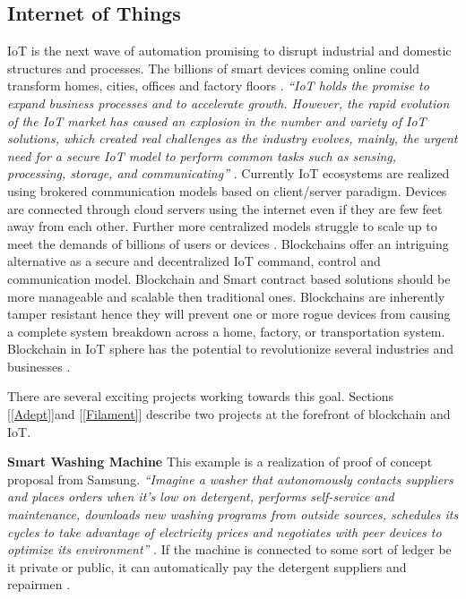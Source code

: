\subsection{Internet of Things}
IoT is the next wave of automation promising to disrupt industrial and domestic structures and processes. The billions of smart devices coming online could transform homes, cities, offices and factory floors \cite{misc:008}. \textit{“IoT holds the promise to expand business processes and to accelerate growth. However, the rapid evolution of the IoT market has caused an explosion in the number and variety of IoT solutions, which created real challenges as the industry evolves, mainly, the urgent need for a secure IoT model to perform common tasks such as sensing, processing, storage, and communicating”} \cite{misc:002}. Currently IoT ecosystems are realized using brokered communication models based on client/server paradigm. Devices are connected through cloud servers using the internet even if they are few feet away from each other. Further more centralized models struggle to scale up to meet the demands of billions of users or devices \cite{misc:004}. Blockchains offer an intriguing alternative as a secure and decentralized IoT command, control and communication model. Blockchain and Smart contract based solutions should be more manageable and scalable then traditional ones. Blockchains are inherently tamper resistant hence they will prevent one or more rogue devices from causing a complete system breakdown across a home, factory, or transportation system. Blockchain in IoT sphere has the potential to revolutionize several industries and businesses \cite{misc:008} \cite{misc:004} \cite{misc:002}.
 
There are several exciting projects working towards this goal. Sections [\ref{Adept}]and [\ref{Filament}] describe two projects at the forefront of blockchain and IoT.


\textbf{Smart Washing Machine}
This example is a realization of proof of concept proposal from Samsung. \textit{“Imagine a washer that autonomously contacts suppliers and places orders when it’s low on detergent, performs self-service and maintenance, downloads new washing programs from outside sources, schedules its cycles to take advantage of electricity prices and negotiates with peer devices to optimize its environment”} \cite{misc:004}. If the machine is connected to some sort of ledger be it private or public, it can automatically pay the detergent suppliers and repairmen \cite{misc:004} \cite{misc:005}.

